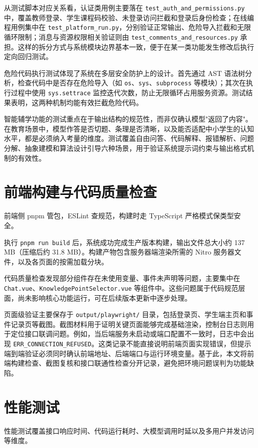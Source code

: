 从测试脚本对应关系看，认证类用例主要落在 \texttt{test\_auth\_and\_permissions.py} 中，覆盖教师登录、学生课程码校验、未登录访问拦截和登录后身份检查；在线编程用例集中在 \texttt{test\_platform\_run.py}，分别验证正常输出、危险导入拦截和无限循环限制；消息与资源权限相关验证则由 \texttt{test\_comments\_and\_resources.py} 承担。这样的拆分方式与系统模块边界基本一致，便于在某一类功能发生修改后执行定向回归测试。

危险代码执行测试体现了系统在多层安全防护上的设计。首先通过 AST 语法树分析，检查代码中是否存在危险导入（如 \texttt{os}、\texttt{sys}、\texttt{subprocess} 等模块）；其次在执行过程中使用 \texttt{sys.settrace} 监控迭代次数，防止无限循环占用服务资源。测试结果表明，这两种机制均能有效拦截危险代码。

智能辅学功能的测试重点在于输出结构的规范性，而非仅确认模型"返回了内容"。在教育场景中，模型作答是否切题、条理是否清晰，以及能否适配中小学生的认知水平，都是必须纳入考量的维度。测试覆盖自由问答、代码解释、报错解析、问题分解、抽象建模和算法设计引导六种场景，用于验证系统提示词约束与输出格式机制的有效性。

\section{前端构建与代码质量检查}
前端侧 pnpm 管包，ESLint 查规范，构建时走 TypeScript 严格模式保类型安全。

执行 \texttt{pnpm run build} 后，系统成功完成生产版本构建，输出文件总大小约 137 MB（压缩后约 31.8 MB）。构建产物包含服务器端渲染所需的 Nitro 服务器文件，以及各页面的按需加载分块。

代码质量检查发现部分组件存在未使用变量、事件未声明等问题，主要集中在 \texttt{Chat.vue}、\texttt{KnowledgePointSelector.vue} 等组件中。这些问题属于代码规范层面，尚未影响核心功能运行，可在后续版本更新中逐步处理。

页面级验证主要保存于 \texttt{output/playwright/} 目录，包括登录页、学生端主页和事件记录页等截图。截图材料用于证明关键页面能够完成基础渲染，控制台日志则用于定位接口联调问题。例如，当后端服务未启动或端口配置不一致时，日志中会出现 \texttt{ERR\_CONNECTION\_REFUSED}。这类记录不能直接说明前端页面实现错误，但提示端到端验证必须同时确认前端地址、后端端口与运行环境变量。基于此，本文将前端构建检查、截图复核和接口联通性检查分开记录，避免把环境问题误判为功能缺陷。

\section{性能测试}
性能测试覆盖接口响应时间、代码运行耗时、大模型调用时延以及多用户并发访问等维度。

